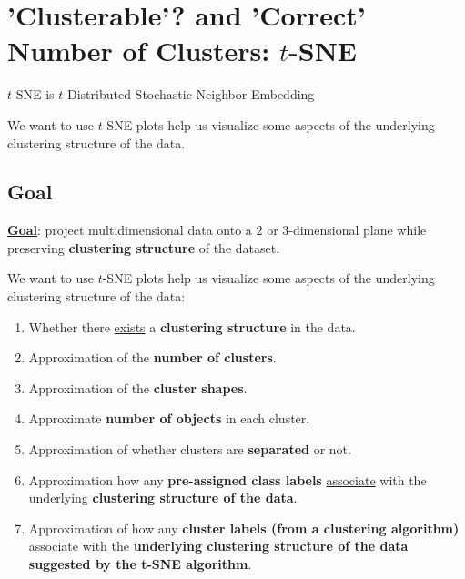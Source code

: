 \documentclass[11pt]{elegantbook}
\begin{document}
\section{'Clusterable'?  and 'Correct' Number of Clusters: $t$-SNE}
$t$-SNE is $t$-Distributed Stochastic Neighbor Embedding

We want to use $t$-SNE plots help us visualize some aspects of the underlying clustering structure of the data.

\subsection{Goal}
\textbf{\underline{Goal}}: project multidimensional data onto a $2$ or $3$-dimensional plane while preserving \textbf{clustering structure} of the dataset.

We want to use $t$-SNE plots help us visualize some aspects of the underlying clustering structure of the data:
\begin{enumerate}
    \item Whether there \underline{exists} a \textbf{clustering structure} in the data.
    \item Approximation of the \textbf{number of clusters}.
    \item Approximation of the \textbf{cluster shapes}.
    \item Approximate \textbf{number of objects} in each cluster.
    \item Approximation of whether clusters are
    \textbf{separated} or not.
    \item Approximation how any \textbf{pre-assigned class labels} \underline{associate} with the underlying \textbf{clustering structure of the data}.
    \item Approximation of how any \textbf{cluster labels (from a clustering algorithm)} associate with the \textbf{underlying clustering structure of the data suggested by the t-SNE algorithm}.
\end{enumerate}
\end{document}
